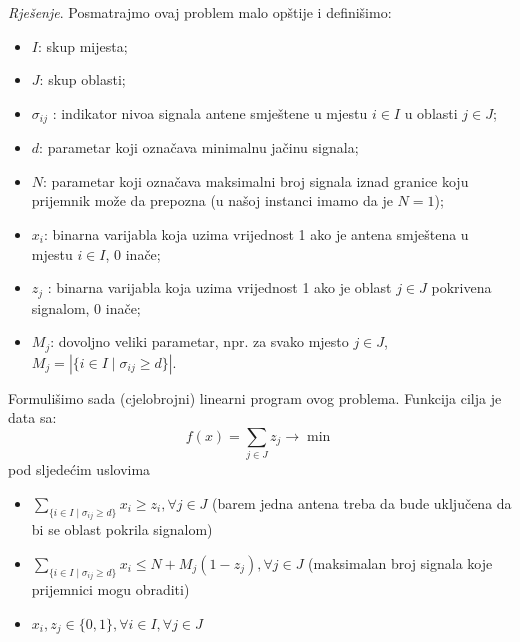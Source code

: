 \documentclass[a4paper, utf8, 11pt, colorlinks]{book}
\begin{document}
\emph{Rješenje}. Posmatrajmo ovaj problem malo opštije i definišimo: 
\begin{itemize}
	\item $I$: skup mijesta;
	\item $J$: skup oblasti;
	\item $\sigma_{ij}$ : indikator nivoa signala antene   smještene u mjestu $i \in I$ u oblasti $j \in J$;
	\item $d$: parametar koji označava minimalnu jačinu signala;
	\item $N$: parametar koji označava maksimalni broj signala iznad granice koju prijemnik može da prepozna (u našoj instanci imamo da je $N=1$);
	\item $x_i$: binarna varijabla koja uzima vrijednost 1 ako je antena smještena u mjestu $i\in I$, 0 inače;
	\item  $z_j$ : binarna varijabla koja uzima vrijednost 1 ako je oblast $j \in J$ pokrivena signalom, 0 inače;
	\item $M_j$: dovoljno veliki parametar, npr. za svako mjesto $j \in J$, $M_j= |\{ i \in I \mid \sigma_{ij} \geq d\}|$.
\end{itemize}
Formulišimo sada (cjelobrojni) linearni program ovog problema. 
Funkcija cilja je data sa:
$$ f(x) = \sum_{j \in J} z_j \rightarrow \min $$
pod sljedećim uslovima 
\begin{itemize}
	\item  $ \sum_{\{i \in I \mid \sigma_{ij} \geq d \}} x_i \geq z_i, \forall j \in J $ (barem jedna antena treba da bude uključena da bi se oblast pokrila signalom)
	\item $ \sum_{\{i \in I \mid \sigma_{ij} \geq d \}} x_i  \leq N + M_j( 1 - z_j), \forall j \in J $ (maksimalan broj signala koje prijemnici mogu obraditi)  
	\item $x_i, z_j \in\{0, 1\}, \forall i \in I, \forall j \in J$
\end{itemize}
\end{document}
